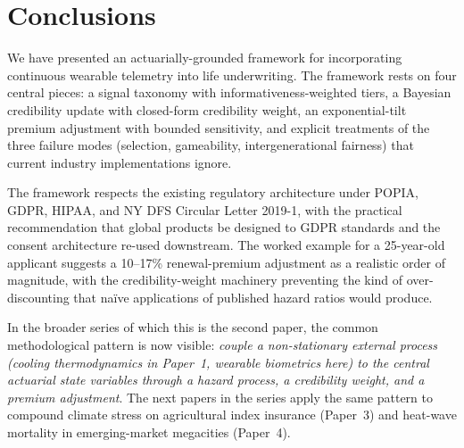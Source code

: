 \documentclass[11pt,a4paper]{article}
\let\origsection\section
\renewcommand{\section}{\clearpage\origsection}
\theoremstyle{ia}
\newcommand{\1}{\mathbf{1}}
\begin{document}
\section{Conclusions}\label{sec:concl}

We have presented an actuarially-grounded framework for incorporating
continuous wearable telemetry into life underwriting. The framework
rests on four central pieces: a signal taxonomy with
informativeness-weighted tiers, a Bayesian credibility update with
closed-form credibility weight, an exponential-tilt premium
adjustment with bounded sensitivity, and explicit treatments of the
three failure modes (selection, gameability, intergenerational
fairness) that current industry implementations ignore.

The framework respects the existing regulatory architecture under
POPIA, GDPR, HIPAA, and NY DFS Circular Letter 2019-1, with the
practical recommendation that global products be designed to GDPR
standards and the consent architecture re-used downstream. The
worked example for a 25-year-old applicant suggests a 10--17\%
renewal-premium adjustment as a realistic order of magnitude, with
the credibility-weight machinery preventing the kind of
over-discounting that na\"ive applications of published hazard
ratios would produce.

In the broader series of which this is the second paper, the
common methodological pattern is now visible: \emph{couple a
non-stationary external process (cooling thermodynamics in
Paper~1, wearable biometrics here) to the central actuarial state
variables through a hazard process, a credibility weight, and a
premium adjustment}. The next papers in the series apply the same
pattern to compound climate stress on agricultural index
insurance (Paper~3) and heat-wave mortality in emerging-market
megacities (Paper~4).
\end{document}
